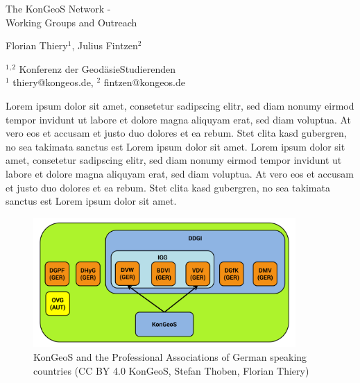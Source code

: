 \documentclass[a4paper]{article}
\begin{document}

\Large
 \begin{center}
The KonGeoS Network -\\ Working Groups and Outreach\\ 

\hspace{10pt}

\large
Florian Thiery$^1$, Julius Fintzen$^2$\\

\hspace{10pt}

\small  
$^1$$^,$$^2$ Konferenz der Geod{\"a}sieStudierenden\\
$^1$ thiery@kongeos.de, $^2$ fintzen@kongeos.de\\

\end{center}

\normalsize

Lorem ipsum dolor sit amet, consetetur sadipscing elitr, sed diam nonumy eirmod tempor invidunt ut labore et dolore magna aliquyam erat, sed diam voluptua. At vero eos et accusam et justo duo dolores et ea rebum. Stet clita kasd gubergren, no sea takimata sanctus est Lorem ipsum dolor sit amet. Lorem ipsum dolor sit amet, consetetur sadipscing elitr, sed diam nonumy eirmod tempor invidunt ut labore et dolore magna aliquyam erat, sed diam voluptua. At vero eos et accusam et justo duo dolores et ea rebum. Stet clita kasd gubergren, no sea takimata sanctus est Lorem ipsum dolor sit amet.

\begin{figure}[!htb]
\begin{center}
\includegraphics[width=10cm]{VerbandsUebersichtDeutschland.png}
\caption{KonGeoS and the Professional Associations of German speaking countries (CC BY 4.0 KonGeoS, Stefan Thoben, Florian Thiery)}
\label{Abb1}
\end{center}
\end{figure}
\end{document}
